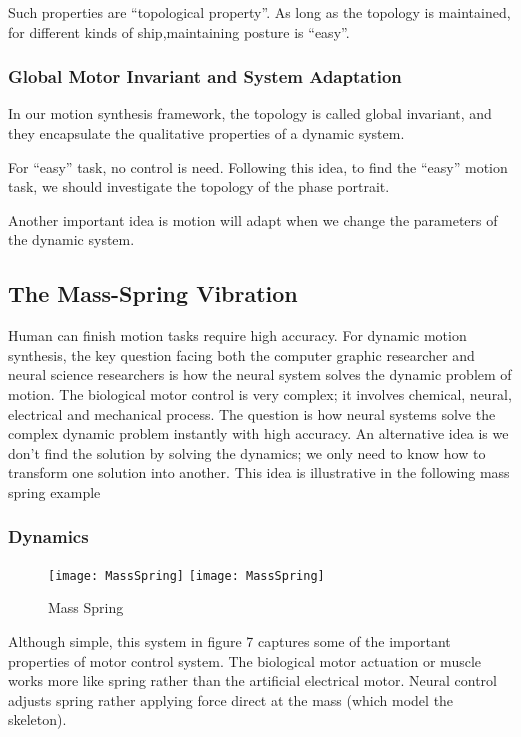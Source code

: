 Such properties are “topological property”.
As long as the topology is maintained, for different kinds of ship,maintaining posture is “easy”.


\subsubsection*{Global Motor Invariant and System Adaptation}
In our motion synthesis framework, the topology is called global invariant, and they encapsulate the qualitative properties of a dynamic system.

For “easy” task, no control is need.
Following this idea, to find the “easy” motion task, we should investigate the topology of the phase portrait.

Another important idea is motion will adapt when we change the parameters of the dynamic system.


\subsection{The Mass-Spring Vibration}
Human can finish motion tasks require high accuracy.
For dynamic motion synthesis, the key question facing both the computer graphic researcher and neural science researchers is how the neural system solves the dynamic problem of motion. 
The biological motor control is very complex; it involves chemical, neural, electrical and mechanical process. 
The question is how neural systems solve the complex dynamic problem instantly with high accuracy.
An alternative idea is we don’t find the solution by solving the dynamics; we only need to know how to transform one solution into another.
This idea is illustrative in the following mass spring example

\subsubsection*{Dynamics}

\begin{figure}[!htbp]
  \begin{center}
    \leavevmode
    \ifpdf
      \texttt{[image: MassSpring]}
    \else
      \texttt{[image: MassSpring]}
    \fi
    \caption{Mass Spring}
    \label{fig:massspring}
  \end{center}
\end{figure}
Although simple, this system in figure 7 captures some of the important properties of motor control system.
The biological motor actuation or muscle works more like spring rather than the artificial electrical motor. Neural control adjusts spring rather applying force direct at the mass (which model the skeleton).


